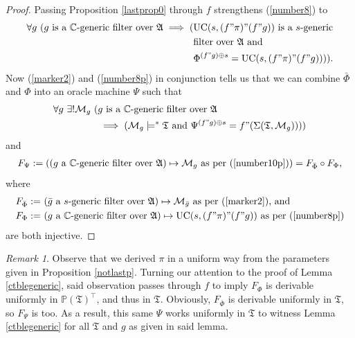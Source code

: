 \documentclass[12pt, twoside]{memoir}
\numberwithin{equation}{section}
\theoremstyle{definition}
\theoremstyle{remark}
\newtheorem{rem}[thm]{Remark}
\theoremstyle{definition}
\theoremstyle{definition}
\theoremstyle{definition}
\theoremstyle{remark}
\begin{document}
\begin{proof}
Passing Proposition \ref{lastprop0} through $f$ strengthens (\ref{number8}) to 
\begin{align}\label{number8p}
\begin{split}
    \forall g \ (g \text{ is a } \mathbb{C} \text{-generic filter over } \mathfrak{A} \implies ( & \mathrm{UC}(s, (f" \pi)" (f" g)) \text{ is a } s \text{-generic} \\ 
    & \text{filter over } \mathfrak{A} \text{ and} \\
    & \Phi^{(f" g) \oplus s} = \mathrm{UC}(s, (f" \pi)" (f" g)))) \text{.}
\end{split}
\end{align}
Now (\ref{marker2}) and (\ref{number8p}) in conjunction tells us that we can combine $\bar{\Phi}$ and $\Phi$ into an oracle machine $\Psi$ such that
\begin{align}\label{number10p}
\begin{split}
    \forall g \ \exists ! \mathcal{M}_g \ ( & g \text{ is a } \mathbb{C} \text{-generic filter over } \mathfrak{A} \\ 
    & \implies (\mathcal{M}_g \models^* \mathfrak{T} \text{ and } \Psi^{(f" g) \oplus s} = f" (\Sigma(\mathfrak{T}, \mathcal{M}_g))))
\end{split}
\end{align}
and
\begin{align*}
    F_{\Psi} := ((g \text{ a } \mathbb{C} \text{-generic filter over } \mathfrak{A}) \mapsto \mathcal{M}_g \text{ as per (\ref{number10p})}) = F_{\bar{\Phi}} \circ F_{\Phi} \text{,}
\end{align*}
where
\begin{align*}
    F_{\bar{\Phi}} := \ & (\bar{g} \text{ a } s \text{-generic filter over } \mathfrak{A}) \mapsto \mathcal{M}_{\bar{g}} \text{ as per (\ref{marker2}), and} \\
    F_{\Phi} := \ & (g \text{ a } \mathbb{C} \text{-generic filter over } \mathfrak{A}) \mapsto \mathrm{UC}(s, (f" \pi)" (f" g)) \text{ as per (\ref{number8p})}
\end{align*}
are both injective. 
\end{proof}

\begin{rem}\label{lastrem}
Observe that we derived $\pi$ in a uniform way from the parameters given in Proposition \ref{notlastp}. Turning our attention to the proof of Lemma \ref{ctblegeneric}, said observation passes through $f$ to imply $F_{\Phi}$ is derivable uniformly in $\mathbb{P}(\mathfrak{T})^{\top}$, and thus in $\mathfrak{T}$. Obviously, $F_{\bar{\Phi}}$ is derivable uniformly in $\mathfrak{T}$, so $F_{\Psi}$ is too. As a result, this same $\Psi$ works uniformly in $\mathfrak{T}$ to witness Lemma \ref{ctblegeneric} for all $\mathfrak{T}$ and $g$ as given in said lemma.
\end{rem}
\end{document}
